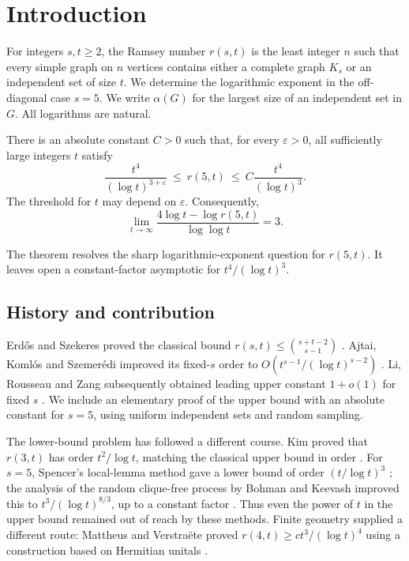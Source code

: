 \section{Introduction}
\label{sec:introduction}

For integers \(s,t\ge2\), the Ramsey number \(r(s,t)\) is the least
integer \(n\) such that every simple graph on \(n\) vertices contains
either a complete graph \(K_s\) or an independent set of size \(t\).
We determine the logarithmic exponent in the off-diagonal case \(s=5\).
We write \(\alpha(G)\) for the largest size of an independent set in \(G\).
All logarithms are natural.

\begin{theorem}
\label{thm:main}
There is an absolute constant \(C>0\) such that, for every
\(\varepsilon>0\), all sufficiently large integers \(t\) satisfy
\[
 \frac{t^4}{(\log t)^{3+\varepsilon}}
 \ \le\ r(5,t)\ \le\
 C\frac{t^4}{(\log t)^3}.
\]
The threshold for \(t\) may depend on \(\varepsilon\).
Consequently,
\[
 \lim_{t\to\infty}
 \frac{4\log t-\log r(5,t)}{\log\log t}=3.
\]
\end{theorem}

The theorem resolves the sharp logarithmic-exponent question for
\(r(5,t)\). It leaves open a constant-factor asymptotic for
\(t^4/(\log t)^3\).

\subsection{History and contribution}

Erd\H{o}s and Szekeres proved the classical bound
\(r(s,t)\le\binom{s+t-2}{s-1}\) \cite{ErdosSzekeres1935}.
Ajtai, Koml\'os and Szemer\'edi improved its fixed-\(s\) order to
\(O(t^{s-1}/(\log t)^{s-2})\) \cite{AKS1980}.
Li, Rousseau and Zang subsequently obtained leading upper constant
\(1+o(1)\) for fixed \(s\) \cite{LiRousseauZang2001}.
We include an elementary proof of the upper bound with an absolute
constant for \(s=5\), using uniform independent sets and random sampling.

The lower-bound problem has followed a different course.  Kim proved
that \(r(3,t)\) has order \(t^2/\log t\), matching the classical upper
bound in order \cite{Kim1995}.  For \(s=5\), Spencer's local-lemma
method gave a lower bound of order \((t/\log t)^3\)
\cite{Spencer1977}; the analysis of the random clique-free process by
Bohman and Keevash improved this to
\(t^3/(\log t)^{8/3}\), up to a constant factor
\cite[Theorem~1.2]{BohmanKeevash2010}.  Thus even the power of \(t\)
in the upper bound remained out of reach by these methods.
Finite geometry supplied a different route: Mattheus and Verstra\"ete
proved \(r(4,t)\ge c t^3/(\log t)^4\) using a construction based on
Hermitian unitals \cite{MattheusVerstraete2024}.


